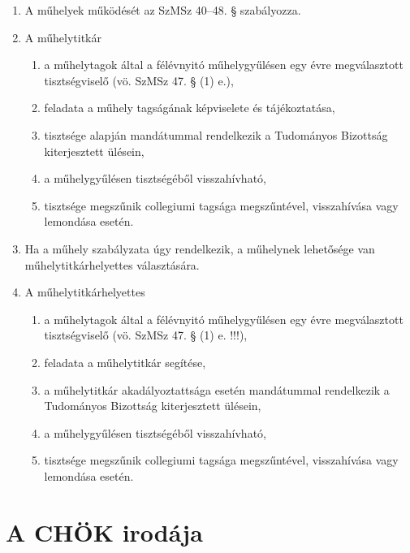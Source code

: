 \documentclass{../styles/rulebook}
\begin{document}
\begin{enumerate}
	\item A műhelyek működését az SzMSz 40–48. § szabályozza.
	\item A műhelytitkár
	\begin{enumerate}
		\item a műhelytagok által a félévnyitó műhelygyűlésen egy évre megválasztott tisztségviselő (vö. SzMSz 47. § (1) e.),
		\item feladata a műhely tagságának képviselete és tájékoztatása,
		\item tisztsége alapján mandátummal rendelkezik a Tudományos Bizottság kiterjesztett ülésein,
		\item a műhelygyűlésen tisztségéből visszahívható,
		\item tisztsége megszűnik collegiumi tagsága megszűntével, visszahívása vagy lemondása esetén.
	\end{enumerate}
	\item Ha a műhely szabályzata úgy rendelkezik, a műhelynek lehetősége van műhelytitkárhelyettes választására.
	\item A műhelytitkárhelyettes
	\begin{enumerate}
		\item a műhelytagok által a félévnyitó műhelygyűlésen egy évre megválasztott tisztségviselő (vö. SzMSz 47. § (1) e. !!!),
		\item feladata a műhelytitkár segítése,
		\item a műhelytitkár akadályoztattsága esetén mandátummal rendelkezik a Tudományos Bizottság kiterjesztett ülésein,
		\item a műhelygyűlésen tisztségéből visszahívható,
		\item tisztsége megszűnik collegiumi tagsága megszűntével, visszahívása vagy lemondása esetén.
	\end{enumerate}
\end{enumerate}


\section{A CHÖK irodája}
\end{document}
